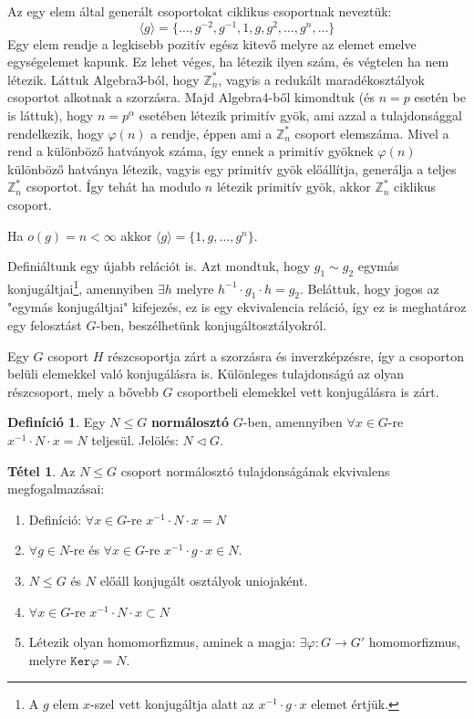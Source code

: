 \documentclass[12pt]{book}
\theoremstyle{plain} %
\theoremstyle{definition} %
\newtheorem{defi/}{Definíció}[section]
\newenvironment{defi}
  {\renewcommand{\qedsymbol}{$\clubsuit$}%
   \pushQED{\qed}\begin{defi/}}
  {\popQED\end{defi/}}
\newtheorem{theo/}{Tétel}[section]
\newenvironment{theo}
  {\renewcommand{\qedsymbol}{$\clubsuit$}%
   \pushQED{\qed}\begin{theo/}}
  {\popQED\end{theo/}}
\theoremstyle{remark}
\renewcommand\qedsymbol{$\blacksquare$}
\numberwithin{equation}{section}  %
\def\Z{\mathbb{Z}}
\begin{document}
	Az egy elem által generált csoportokat ciklikus csoportnak neveztük:
	\[ \langle g \rangle = \{ \ldots, g^{-2}, g^{-1}, 1, g, g^2, \ldots, g^n, \ldots \} \] 
	Egy elem rendje a legkisebb pozitív egész kitevő melyre az elemet emelve egységelemet kapunk. Ez lehet véges, ha létezik ilyen szám, és végtelen ha nem létezik. Láttuk Algebra3-ból, hogy $\Z_n^{*}$, vagyis a redukált maradékosztályok csoportot alkotnak a szorzásra. Majd Algebra4-ből kimondtuk (és $n=p$ esetén be is láttuk), hogy $n=p^{\alpha}$ esetében létezik primitív gyök, ami azzal a tulajdonsággal rendelkezik, hogy $\varphi(n)$ a rendje, éppen ami a $\Z_n^{*}$ csoport elemszáma. Mivel a rend a különböző hatványok száma, így ennek a primitív gyöknek $\varphi(n)$ különböző hatványa létezik, vagyis egy primitív gyök előállítja, generálja a teljes $\Z_n^{*}$ csoportot. Így tehát ha modulo $n$ létezik primitív gyök, akkor $\Z_n^{*}$ ciklikus csoport.
	
	Ha $o(g)=n<\infty$ akkor $\langle g \rangle = \{1, g, \ldots, g^n\}$.
	
	Definiáltunk egy újabb relációt is. Azt mondtuk, hogy $g_1\sim g_2$ egymás konjugáltjai\footnote{A $g$ elem $x$-szel vett konjugáltja alatt az $x^{-1}\cdot g\cdot x$ elemet értjük.}, amennyiben $\exists h$ melyre $h^{-1}\cdot g_1 \cdot h = g_2$. Beláttuk, hogy jogos az "egymás konjugáltjai" kifejezés, ez is egy ekvivalencia reláció, így ez is meghatároz egy felosztást $G$-ben, beszélhetünk konjugáltosztályokról.
	
	Egy $G$ csoport $H$ részcsoportja zárt a szorzásra és inverzképzésre, így a csoporton belüli elemekkel való konjugálásra is. Különleges tulajdonságú az olyan részcsoport, mely a bővebb $G$ csoportbeli elemekkel vett konjugálásra is zárt.
	
	\begin{defi}
		Egy $N\leq G$ \textbf{normálosztó} $G$-ben, amennyiben $\forall x\in G$-re $x^{-1}\cdot N \cdot x = N$ teljesül. Jelölés: $N\triangleleft G$.
	\end{defi}
	
	\begin{theo}\label{nekvi}
		Az $N\leq G$ csoport normálosztó tulajdonságának ekvivalens megfogalmazásai:
		\begin{enumerate}
			\item Definíció: $\forall x\in G$-re $x^{-1} \cdot N \cdot x = N$
			\item $\forall g\in N$-re és $\forall x\in G$-re $x^{-1}\cdot g \cdot x \in N$.
			\item $N\leq G$ és $N$ előáll konjugált osztályok uniojaként.
			\item $\forall x\in G$-re $x^{-1}\cdot N \cdot x \subset N$
			\item Létezik olyan homomorfizmus, aminek a magja: $\exists \varphi: G\to G'$ homomorfizmus, melyre $\mathtt{Ker}\varphi = N$.
		\end{enumerate}
	\end{theo}
\end{document}
